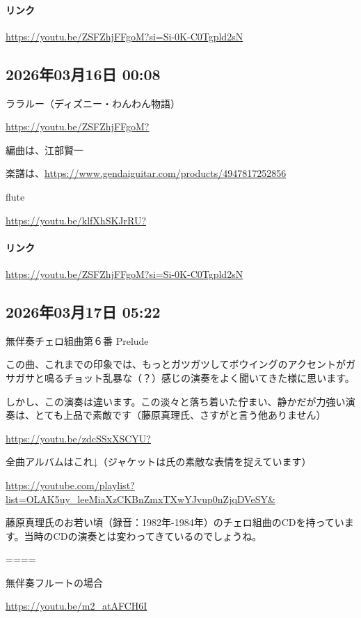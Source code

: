 \paragraph{リンク}
\url{https://youtu.be/ZSFZhjFFgoM?si=Si-0K-C0Tgpld2sN}

\subsection*{2026年03月16日 00:08}

ララルー（ディズニー・わんわん物語）

\url{https://youtu.be/ZSFZhjFFgoM?}

編曲は、江部賢一

楽譜は、\url{https://www.gendaiguitar.com/products/4947817252856}

flute

\url{https://youtu.be/klfXhSKJrRU?}

\paragraph{リンク}
\url{https://youtu.be/ZSFZhjFFgoM?si=Si-0K-C0Tgpld2sN}

\subsection*{2026年03月17日 05:22}

無伴奏チェロ組曲第６番 Prelude

この曲、これまでの印象では、もっとガツガツしてボウイングのアクセントがガサガサと鳴るチョット乱暴な（？）感じの演奏をよく聞いてきた様に思います。

しかし、この演奏は違います。この淡々と落ち着いた佇まい、静かだが力強い演奏は、とても上品で素敵です（藤原真理氏、さすがと言う他ありません）

\url{https://youtu.be/zdcSSxXSCYU?}

全曲アルバムはこれ↓（ジャケットは氏の素敵な表情を捉えています）

\url{https://youtube.com/playlist?list=OLAK5uy_leeMiaXzCKBnZmxTXwYJvup0nZjqDVeSY&}

藤原真理氏のお若い頃（録音：1982年-1984年）のチェロ組曲のCDを持っています。当時のCDの演奏とは変わってきているのでしょうね。

====

無伴奏フルートの場合

\url{https://youtu.be/m2_atAFCH6I}


